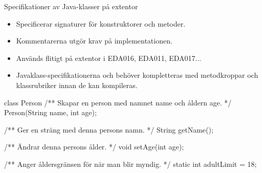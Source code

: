 \ifkompendium
\begin{Slide}{Specifikationer av Java-klasser på extentor}
\begin{itemize}\small
\item Specificerar signaturer för konstruktorer och metoder.
\item Kommentarerna utgör krav på implementationen.
\item Används flitigt på extentor i EDA016, EDA011, EDA017...
\item Javaklass-specifikationerna   och behöver kompletteras med metodkroppar och klassrubriker innan de kan kompileras.
\end{itemize}
\begin{JavaSpec}{class Person}
/** Skapar en person med namnet name och åldern age. */
Person(String name, int age);

/** Ger en sträng med denna persons namn. */
String getName();

/** Ändrar denna persons ålder. */
void setAge(int age);

/** Anger åldersgränsen för när man blir myndig. */
static int adultLimit = 18;
\end{JavaSpec}
\end{Slide}
\fi
